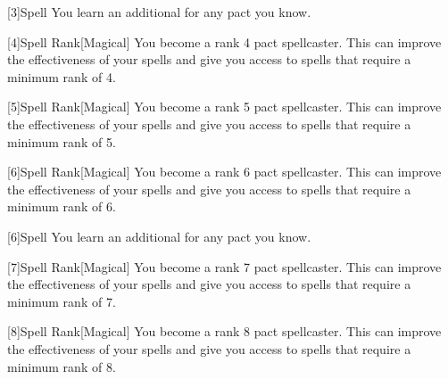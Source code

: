         [3]{Spell} You learn an additional  for any pact  you know.

        [4]{Spell Rank}[Magical] You become a rank 4 pact spellcaster.
        This can improve the effectiveness of your spells and give you access to spells that require a minimum rank of 4.

        [5]{Spell Rank}[Magical] You become a rank 5 pact spellcaster.
        This can improve the effectiveness of your spells and give you access to spells that require a minimum rank of 5.

        [6]{Spell Rank}[Magical] You become a rank 6 pact spellcaster.
        This can improve the effectiveness of your spells and give you access to spells that require a minimum rank of 6.

        [6]{Spell} You learn an additional  for any pact  you know.

        [7]{Spell Rank}[Magical] You become a rank 7 pact spellcaster.
        This can improve the effectiveness of your spells and give you access to spells that require a minimum rank of 7.

        [8]{Spell Rank}[Magical] You become a rank 8 pact spellcaster.
        This can improve the effectiveness of your spells and give you access to spells that require a minimum rank of 8.






